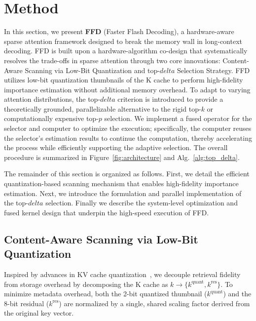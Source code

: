 \documentclass[]{mosi}
\def\bm#1{#1}%
\def\delta{delta}%
\theoremstyle{plain}
\theoremstyle{definition}
\theoremstyle{remark}
\begin{document}
\section{Method}
\label{sec:method}





In this section, we present \textbf{FFD} (Faster Flash Decoding), a hardware-aware sparse attention framework designed to break the memory wall in long-context decoding. FFD is built upon a hardware-algorithm co-design that systematically resolves the trade-offs in sparse attention through two core innovations: Content-Aware Scanning via Low-Bit Quantization and top-$\bm\delta$ Selection Strategy. FFD utilizes low-bit quantization thumbnails of the K cache to perform high-fidelity importance estimation without additional memory overhead. To adapt to varying attention distributions, the top-$\delta$ criterion is introduced to provide a theoretically grounded, parallelizable alternative to the rigid top-$k$ or computationally expensive top-$p$ selection. We implement a fused operator for the selector and computer to optimize the execution; specifically, the computer reuses the selector's estimation results to continue the computation, thereby accelerating the process while efficiently supporting the adaptive selection. The overall procedure is summarized in Figure~\ref{fig:architecture} and Alg.~\ref{alg:top_delta}.

The remainder of this section is organized as follows. First, we detail the efficient quantization-based scanning mechanism that enables high-fidelity importance estimation. Next, we introduce the formulation and parallel implementation of the top-$\delta$ selection. Finally we describe the system-level optimization and fused kernel design that underpin the high-speed execution of FFD.


\subsection{Content-Aware Scanning via Low-Bit Quantization}


Inspired by advances in KV cache quantization~\citep{liu2024kivi, hooper2024kvquant, yang2024no}, we decouple retrieval fidelity from storage overhead by decomposing the K cache as $\bm{k} \to \{\bm{k}^\text{quant}, \bm{k}^{\text{res}}\}$. To minimize metadata overhead, both the 2-bit quantized thumbnail ($\bm{k}^\text{quant}$) and the 8-bit residual ($\bm{k}^{\text{res}}$) are normalized by a single, shared scaling factor derived from the original key vector. 
\end{document}
